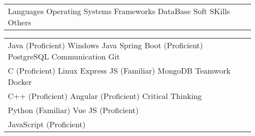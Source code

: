 \documentclass[]{awesome-cv}
\begin{document}
\vspace{-5mm}
\begin{cventries}
	\cventry
	{}
	{\def\arraystretch{1.15}{\begin{tabular}{ l l }
		Languages \hspace{1cm} Operating Systems \hspace{1.2cm} Frameworks \hspace{1.5cm} DataBase \hspace{1cm} Soft SKills \hspace{1cm} Others  & {\skill{ }} \\
		\end{tabular}} \vspace{-7mm}}
	{}
	{}
	{\begin{cvitems}
			\item {{\begin{tabular}{ l l }
						Java (Proficient) \hspace{1.5cm} Windows \hspace{1.3cm}  Java Spring Boot (Proficient) \hspace{0.6cm} PostgreSQL \hspace{0.8cm} Communication \hspace{1.1cm} Git  & {\skill{ }} \\
						C (Proficient) \hspace{2cm} Linux \hspace{2.2cm} Express JS (Familiar)  \hspace{1.2cm} MongoDB \hspace{1.3cm} Teamwork \hspace{1.2cm} Docker & {\skill{ }} \\
						C++ (Proficient) \hspace{4.7cm} Angular (Proficient) \hspace{3.6cm} Critical Thinking  & {\skill{ }} \\
						Python (Familiar) \hspace{4.7cm} Vue JS (Proficient)  & {\skill{ }} \\
						JavaScript (Proficient) \hspace{4.1cm} & {\skill{ }} \\ 
			\end{tabular}}}
		\end{cvitems}\def\arraystretch{1.15}}
	
\end{cventries}

\vspace{-4mm}
\end{document}

